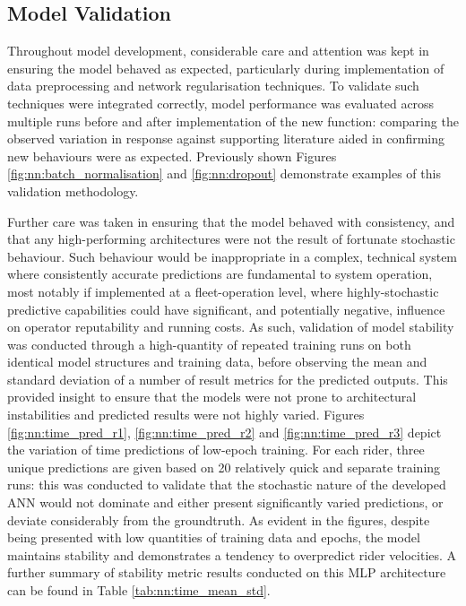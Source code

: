 \documentclass[a4paper, 10pt]{article}
\numberwithin{equation}{section}
\begin{document}
\subsection{Model Validation}
\label{sec:nn:validation}
Throughout model development, considerable care and attention was kept in ensuring the model behaved as expected, particularly during implementation of data preprocessing and network regularisation techniques. To validate such techniques were integrated correctly, model performance was evaluated across multiple runs before and after implementation of the new function: comparing the observed variation in response against supporting literature aided in confirming new behaviours were as expected. Previously shown Figures \ref{fig:nn:batch_normalisation}
and \ref{fig:nn:dropout} demonstrate examples of this validation methodology.

Further care was taken in ensuring that the model behaved with consistency, and that any high-performing architectures were not the result of fortunate stochastic behaviour. Such behaviour would be inappropriate in a complex, technical system where consistently accurate predictions are fundamental to system operation, most notably if implemented at a fleet-operation level, where highly-stochastic predictive capabilities could have significant, and potentially negative, influence on operator reputability and running costs. As such, validation of model stability was conducted through a high-quantity of repeated training runs on both identical model structures and training data, before observing the mean and standard deviation of a number of result metrics for the predicted outputs. This provided insight to ensure that the models were not prone to architectural instabilities and predicted results were not highly varied. Figures \ref{fig:nn:time_pred_r1}, \ref{fig:nn:time_pred_r2} and \ref{fig:nn:time_pred_r3} depict the variation of time predictions of low-epoch training. For each rider, three unique predictions are given based on 20 relatively quick and separate training runs: this was conducted to validate that the stochastic nature of the developed ANN would not dominate and either present significantly varied predictions, or deviate considerably from the groundtruth. As evident in the figures, despite being presented with low quantities of training data and epochs, the model maintains stability and demonstrates a tendency to overpredict rider velocities. A further summary of stability metric results conducted on this MLP architecture can be found in Table \ref{tab:nn:time_mean_std}.
\end{document}

